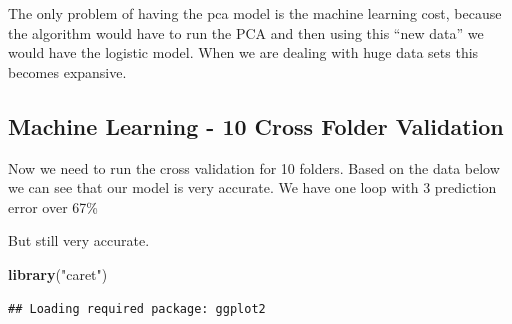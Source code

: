 \documentclass[]{article}
\newenvironment{Shaded}{\begin{snugshade}}{\end{snugshade}}
\newcommand{\KeywordTok}[1]{\textcolor[rgb]{0.13,0.29,0.53}{\textbf{{#1}}}}
\newcommand{\DataTypeTok}[1]{\textcolor[rgb]{0.13,0.29,0.53}{{#1}}}
\newcommand{\DecValTok}[1]{\textcolor[rgb]{0.00,0.00,0.81}{{#1}}}
\newcommand{\StringTok}[1]{\textcolor[rgb]{0.31,0.60,0.02}{{#1}}}
\newcommand{\CommentTok}[1]{\textcolor[rgb]{0.56,0.35,0.01}{\textit{{#1}}}}
\newcommand{\NormalTok}[1]{{#1}}
\begin{document}
The only problem of having the pca model is the machine learning cost,
because the algorithm would have to run the PCA and then using this
``new data'' we would have the logistic model. When we are dealing with
huge data sets this becomes expansive.

\subsection{Machine Learning - 10 Cross Folder
Validation}\label{machine-learning---10-cross-folder-validation}

Now we need to run the cross validation for 10 folders. Based on the
data below we can see that our model is very accurate. We have one loop
with 3 prediction error over 67\%

But still very accurate.

\begin{Shaded}
\begin{Highlighting}[]
\KeywordTok{library}\NormalTok{(}\StringTok{"caret"}\NormalTok{)}
\end{Highlighting}
\end{Shaded}

\begin{verbatim}
## Loading required package: ggplot2
\end{verbatim}

\begin{Shaded}
\end{Shaded}
\end{document}
